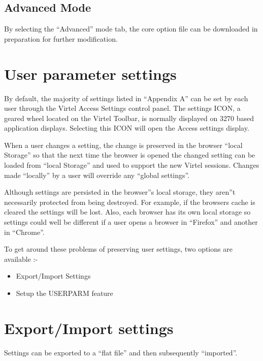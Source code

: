 \documentclass[letterpaper,10pt,english]{sphinxmanual}
\begin{document}
\subsection{Advanced Mode}
\label{\detokenize{TN202002:advanced-mode}}
By selecting the “Advanced” mode tab, the core option file can be downloaded in preparation for further modification.



\section{User parameter settings}
\label{\detokenize{TN202002:user-parameter-settings}}
By default, the majority of settings listed in “Appendix A” can be set by each user through the Virtel Access Settings control panel. The settings ICON, a geared wheel located on the Virtel Toolbar, is normally displayed on 3270 based application displays. Selecting this ICON will open the Access settings display.


When a user changes a setting, the change is preserved in the browser “local Storage” so that the next time the browser is opened the changed setting can be loaded from “local Storage” and used to support the new Virtel sessions. Changes made “locally” by a user will override any “global settings”.

Although settings are persisted in the browser”s local storage, they aren”t necessarily protected from being destroyed. For example, if the browsers cache is cleared the settings will be lost. Also, each browser has its own local storage so settings could well be different if a user opens a browser in “Firefox” and another in “Chrome”.

To get around these problems of preserving user settings, two options are available :-
\begin{itemize}
\item {} 
Export/Import Settings

\item {} 
Setup the USERPARM feature

\end{itemize}


\section{Export/Import settings}
\label{\detokenize{TN202002:export-import-settings}}
Settings can be exported to a “flat file” and then subsequently “imported”.
\end{document}
